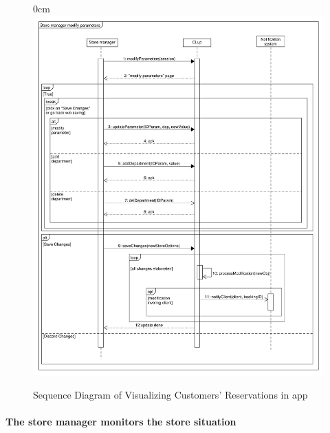 \documentclass{article}
\begin{document}
\begin{center}
							\begin{figure}[!h]
								\begin{adjustwidth} {0cm}{}
									\centering
									\includegraphics[scale=0.37]{SD/7_modifyParameters.pdf}\\
									\caption{Sequence Diagram of Visualizing Customers' Reservations in app}
								\end{adjustwidth}
							\end{figure}

				\end{center}



\newpage
			
			\paragraph{The store manager monitors the store situation}
			
\end{document}
